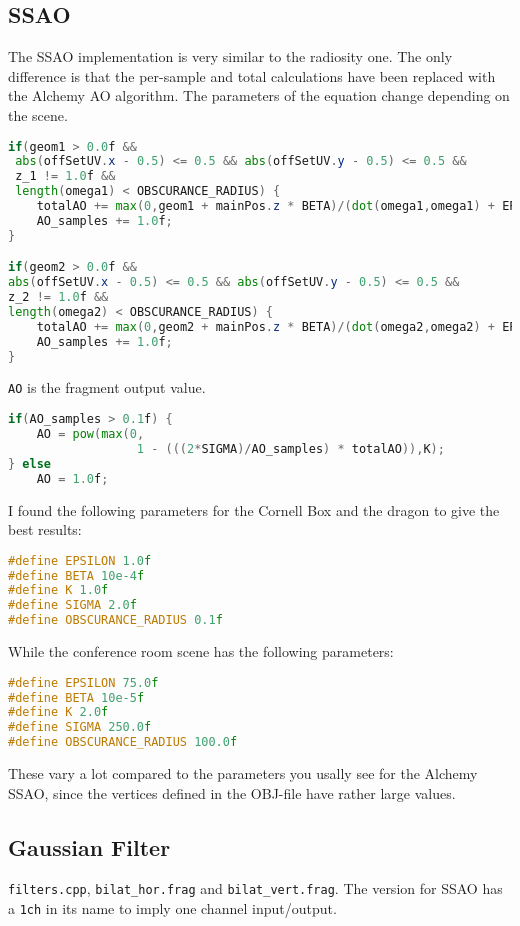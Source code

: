 \subsection{SSAO}
The SSAO implementation is very similar to the radiosity one. The only difference is that the per-sample and total calculations have been replaced with the Alchemy AO algorithm\cite{VV11AlchemyAO}. The parameters of the equation change depending on the scene.
\begin{lstlisting}[caption={apply\_ssao.frag},language=GLSL]
if(geom1 > 0.0f &&
 abs(offSetUV.x - 0.5) <= 0.5 && abs(offSetUV.y - 0.5) <= 0.5 &&
 z_1 != 1.0f &&
 length(omega1) < OBSCURANCE_RADIUS) {
    totalAO += max(0,geom1 + mainPos.z * BETA)/(dot(omega1,omega1) + EPSILON);
    AO_samples += 1.0f;
}

if(geom2 > 0.0f &&
abs(offSetUV.x - 0.5) <= 0.5 && abs(offSetUV.y - 0.5) <= 0.5 &&
z_2 != 1.0f &&
length(omega2) < OBSCURANCE_RADIUS) {
    totalAO += max(0,geom2 + mainPos.z * BETA)/(dot(omega2,omega2) + EPSILON);
    AO_samples += 1.0f;
}
\end{lstlisting}

\verb=AO= is the fragment output value.
\begin{lstlisting}[caption={apply\_ssao.frag},language=GLSL]
if(AO_samples > 0.1f) {
    AO = pow(max(0,
                  1 - (((2*SIGMA)/AO_samples) * totalAO)),K);
} else
    AO = 1.0f;
\end{lstlisting}

I found the following parameters for the Cornell Box and the dragon to give the best results:
\begin{lstlisting}[language=c++]
#define EPSILON 1.0f
#define BETA 10e-4f
#define K 1.0f
#define SIGMA 2.0f
#define OBSCURANCE_RADIUS 0.1f
\end{lstlisting}
While the conference room scene has the following parameters:
\begin{lstlisting}[language=c++]
#define EPSILON 75.0f
#define BETA 10e-5f
#define K 2.0f
#define SIGMA 250.0f
#define OBSCURANCE_RADIUS 100.0f
\end{lstlisting}
These vary a lot compared to the parameters you usally see for the Alchemy SSAO, since the vertices defined in the OBJ-file have rather large values.

\subsection{Gaussian Filter}
\verb=filters.cpp=, \verb=bilat_hor.frag= and \verb=bilat_vert.frag=. The version for SSAO has a \verb=1ch= in its name to imply one channel input/output.

